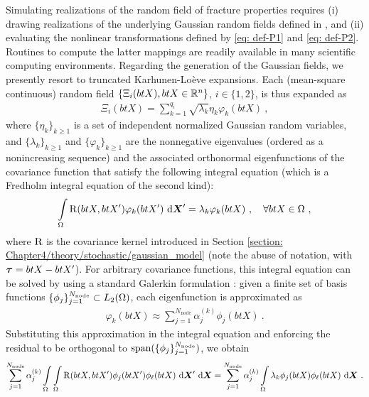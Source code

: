 Simulating realizations of the random field of fracture properties requires (i) drawing realizations of the underlying Gaussian random fields defined in , and (ii) evaluating the nonlinear transformations defined by \eqref{eq: def-P1} and \eqref{eq: def-P2}. Routines to compute the latter mappings are readily available in many scientific computing environments. Regarding the generation of the Gaussian fields, we presently resort to truncated Karhunen-Lo\`eve expansions. Each (mean-square continuous) random field $\{\Xi_i(btX), btX \in \mathbb{R}^n\}$, $i \in \{1,2\}$, is thus expanded as
\begin{align}
  \Xi_i(btX) = \sum\limits_{k=1}^{q_i} \sqrt{\lambda_k} \eta_k \varphi_k(btX)~,
\end{align}
where $\{\eta_k\}_{k \geqslant 1}$ is a set of independent normalized Gaussian random variables, and $\{\lambda_k\}_{k \geqslant 1}$ and $\{\varphi_k\}_{k \geqslant 1}$ are the nonnegative eigenvalues (ordered as a nonincreasing sequence) and the associated orthonormal eigenfunctions of the covariance function that satisfy the following integral equation (which is a Fredholm integral equation of the second kind):
\begin{align}
  \int\limits_\Omega \operatorname{R}(btX,btX')\varphi_k(btX') \text{ d}\boldsymbol{X}' = \lambda_k\varphi_k(btX)~, \quad \forall btX \in \Omega~, \label{eq: FIE2}
\end{align}
where $\operatorname{R}$ is the covariance kernel introduced in Section \ref{section: Chapter4/theory/stochastic/gaussian_model} (note the abuse of notation, with $\boldsymbol{\tau} = btX - btX'$). For arbitrary covariance functions, this integral equation can be solved by using a standard Galerkin formulation \cite{GhanemSpanos,LMK2010}: given a finite set of basis functions $\{\phi_j\}_{j=1}^{N_\text{node}} \subset L_2(\Omega)$,
each eigenfunction is approximated as
\begin{align}
  \varphi_k(btX) \approx \sum_{j=1}^{N_{\text{node}}} \alpha_{j}^{(k)}\phi_j(btX)~. \label{eq: eigenfunction approximation}
\end{align}
Substituting this approximation in the integral equation and enforcing the residual to be orthogonal to $\operatorname{span}(\{\phi_j\}_{j=1}^{N_\text{node}})$, we obtain
\begin{align}
  \sum_{j=1}^{N_{\text{node}}} \alpha_{j}^{(k)} \int\limits_\Omega \int\limits_\Omega \operatorname{R}(btX,btX') \phi_j(btX')\phi_\ell(btX) \text{ d}\boldsymbol{X}' \text{ d}\boldsymbol{X} = \sum_{j=1}^{N_{\text{node}}} \alpha_{j}^{(k)} \int\limits_\Omega \lambda_k \phi_j(btX)\phi_\ell(btX) \text{ d}\boldsymbol{X}~. \label{eq: gevp}
\end{align}

